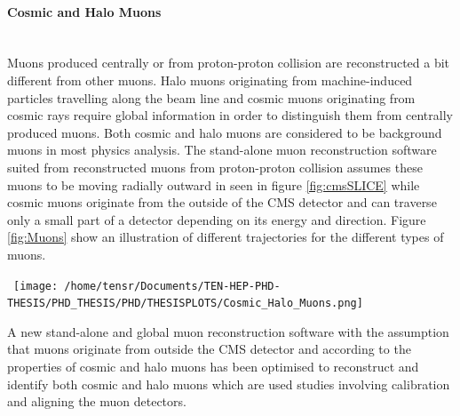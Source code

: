 \paragraph*{Cosmic and Halo Muons}\mbox{}\\
Muons produced centrally or from proton-proton collision are reconstructed a bit different from other muons. Halo muons originating from machine-induced particles travelling along the beam line and cosmic muons originating from cosmic rays require global information in order to distinguish them from centrally produced muons. Both cosmic and halo muons are considered to be background muons in most physics analysis. The stand-alone muon reconstruction software suited from reconstructed muons from proton-proton collision assumes these muons to be moving radially outward in seen in figure \ref{fig:cmsSLICE} while cosmic muons originate from the outside of the CMS detector and can traverse only a small part of a detector depending on its energy and direction.
Figure \ref{fig:Muons} show an illustration of different trajectories for the different types of muons. 

\begin{center}
\centering
\mbox{
\texttt{[image: /home/tensr/Documents/TEN-HEP-PHD-THESIS/PHD\_THESIS/PHD/THESISPLOTS/Cosmic\_Halo\_Muons.png]} }
\label{fig:Muons}
\end{center}

A new stand-alone and global muon reconstruction software with the assumption that muons originate from outside the CMS detector and according to the properties of cosmic and halo muons has been optimised to reconstruct and identify both cosmic and halo muons which are used studies involving calibration and aligning the muon detectors.

